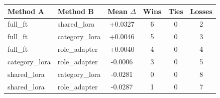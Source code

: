 \begin{tabular}{llcccc}
\toprule
Method A & Method B & Mean $\Delta$ & Wins & Ties & Losses \\
\midrule
full\_ft & shared\_lora & +0.0327 & 6 & 0 & 2 \\
full\_ft & category\_lora & +0.0046 & 5 & 0 & 3 \\
full\_ft & role\_adapter & +0.0040 & 4 & 0 & 4 \\
category\_lora & role\_adapter & -0.0006 & 3 & 0 & 5 \\
shared\_lora & category\_lora & -0.0281 & 0 & 0 & 8 \\
shared\_lora & role\_adapter & -0.0287 & 1 & 0 & 7 \\
\bottomrule
\end{tabular}
